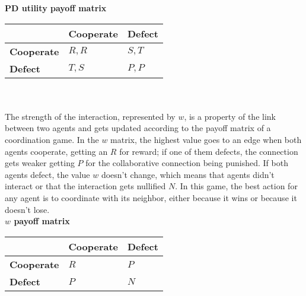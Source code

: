 \documentclass{bmcart}
\begin{document}
{\bf PD utility payoff matrix}\\

\begin{tabular}{| l | l | l |}
\hline
          & \bf{Cooperate} & \bf{Defect} \\ \hline
\bf{Cooperate} &  $R,R$      &  $S,T$   \\ \hline
\bf{Defect}    &  $T,S$      &  $P,P$   \\ \hline

\end{tabular}\\ \\

The strength of the interaction, represented by $w$, is a property of
the link between two agents and gets updated according to the payoff
matrix of a coordination game. In the $w$ matrix, the highest value
goes to an edge when both agents cooperate, getting an $R$ for reward;
if one of them defects, the connection gets weaker getting $P$ for the
collaborative connection being punished. If both agents defect, the
value $w$ doesn't change, which means that agents didn't interact or
that the interaction gets nullified $N$. In this game, the best action
for any agent is to coordinate with its neighbor, either because it
wins or because it doesn't lose. \\

{\bf $w$ payoff matrix}\\

\begin{tabular}{| l | l | l |}
\hline
          & \bf{Cooperate} & \bf{Defect} \\ \hline
\bf{Cooperate} &  $R$      &  $P$   \\ \hline
\bf{Defect}    &  $P$      &  $N$   \\ \hline

\end{tabular}\\ \\
\end{document}
